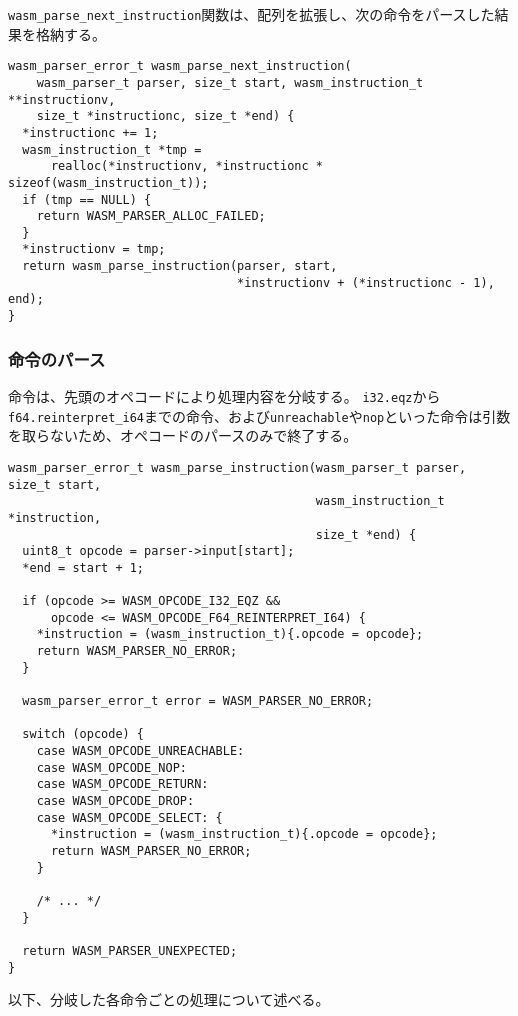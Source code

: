 \verb|wasm_parse_next_instruction|関数は、配列を拡張し、次の命令をパースした結果を格納する。

\begin{lstlisting}[caption=命令のパース,label=lst:argument_t]
wasm_parser_error_t wasm_parse_next_instruction(
    wasm_parser_t parser, size_t start, wasm_instruction_t **instructionv,
    size_t *instructionc, size_t *end) {
  *instructionc += 1;
  wasm_instruction_t *tmp =
      realloc(*instructionv, *instructionc * sizeof(wasm_instruction_t));
  if (tmp == NULL) {
    return WASM_PARSER_ALLOC_FAILED;
  }
  *instructionv = tmp;
  return wasm_parse_instruction(parser, start,
                                *instructionv + (*instructionc - 1), end);
}
\end{lstlisting}

\subsubsection{命令のパース}

命令は、先頭のオペコードにより処理内容を分岐する。
\verb|i32.eqz|から\verb|f64.reinterpret_i64|までの命令、および\verb|unreachable|や\verb|nop|といった命令は引数を取らないため、オペコードのパースのみで終了する。

\begin{lstlisting}[caption=命令のパース,label=lst:argument_t]
wasm_parser_error_t wasm_parse_instruction(wasm_parser_t parser, size_t start,
                                           wasm_instruction_t *instruction,
                                           size_t *end) {
  uint8_t opcode = parser->input[start];
  *end = start + 1;

  if (opcode >= WASM_OPCODE_I32_EQZ &&
      opcode <= WASM_OPCODE_F64_REINTERPRET_I64) {
    *instruction = (wasm_instruction_t){.opcode = opcode};
    return WASM_PARSER_NO_ERROR;
  }

  wasm_parser_error_t error = WASM_PARSER_NO_ERROR;

  switch (opcode) {
    case WASM_OPCODE_UNREACHABLE:
    case WASM_OPCODE_NOP:
    case WASM_OPCODE_RETURN:
    case WASM_OPCODE_DROP:
    case WASM_OPCODE_SELECT: {
      *instruction = (wasm_instruction_t){.opcode = opcode};
      return WASM_PARSER_NO_ERROR;
    }

    /* ... */
  }

  return WASM_PARSER_UNEXPECTED;
}
\end{lstlisting}

以下、分岐した各命令ごとの処理について述べる。

